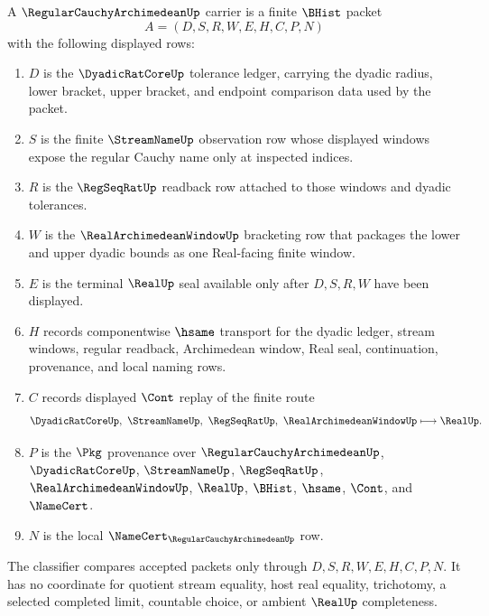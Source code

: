 \begin{definition}
\label{def:regular-cauchy-archimedean-carrier}
A $\RegularCauchyArchimedeanUp$ carrier is a finite $\BHist$ packet
$$
A=(D,S,R,W,E,H,C,P,N)
$$
with the following displayed rows:
\begin{enumerate}
\item $D$ is the $\DyadicRatCoreUp$ tolerance ledger, carrying the dyadic radius, lower bracket, upper bracket, and endpoint comparison data used by the packet.
\item $S$ is the finite $\StreamNameUp$ observation row whose displayed windows expose the regular Cauchy name only at inspected indices.
\item $R$ is the $\RegSeqRatUp$ readback row attached to those windows and dyadic tolerances.
\item $W$ is the $\RealArchimedeanWindowUp$ bracketing row that packages the lower and upper dyadic bounds as one Real-facing finite window.
\item $E$ is the terminal $\RealUp$ seal available only after $D,S,R,W$ have been displayed.
\item $H$ records componentwise $\hsame$ transport for the dyadic ledger, stream windows, regular readback, Archimedean window, Real seal, continuation, provenance, and local naming rows.
\item $C$ records displayed $\Cont$ replay of the finite route
$$
\DyadicRatCoreUp,\ \StreamNameUp,\ \RegSeqRatUp,\ \RealArchimedeanWindowUp \longmapsto \RealUp .
$$
\item $P$ is the $\Pkg$ provenance over $\RegularCauchyArchimedeanUp$, $\DyadicRatCoreUp$, $\StreamNameUp$, $\RegSeqRatUp$, $\RealArchimedeanWindowUp$, $\RealUp$, $\BHist$, $\hsame$, $\Cont$, and $\NameCert$.
\item $N$ is the local $\NameCert_{\RegularCauchyArchimedeanUp}$ row.
\end{enumerate}
The classifier compares accepted packets only through $D,S,R,W,E,H,C,P,N$. It has no coordinate for quotient stream equality, host real equality, trichotomy, a selected completed limit, countable choice, or ambient $\RealUp$ completeness.
\end{definition}


